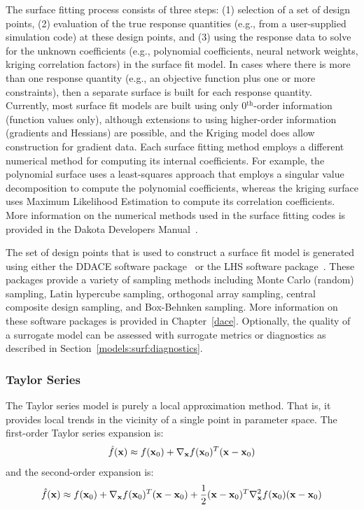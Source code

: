 The surface fitting process consists of three steps: (1) selection of
a set of design points, (2) evaluation of the true response quantities
(e.g., from a user-supplied simulation code) at these design points,
and (3) using the response data to solve for the unknown coefficients
(e.g., polynomial coefficients, neural network weights, kriging
correlation factors) in the surface fit model. In cases where there is
more than one response quantity (e.g., an objective function plus one
or more constraints), then a separate surface is built for each
response quantity. Currently, most surface fit models are built using
only 0$^{\mathrm{th}}$-order information (function values only),
although extensions to using higher-order information (gradients and
Hessians) are possible, and the Kriging model does allow construction
for gradient data. Each surface fitting method employs a different
numerical method for computing its internal coefficients. For example,
the polynomial surface uses a least-squares approach that employs a
singular value decomposition to compute the polynomial coefficients,
whereas the kriging surface uses Maximum Likelihood Estimation to
compute its correlation coefficients. More information on the
numerical methods used in the surface fitting codes is provided in the
Dakota Developers Manual~\cite{DevMan}.

The set of design points that is used to construct a surface fit model
is generated using either the DDACE software package~\cite{TonXX} or
the LHS software package~\cite{Ima84}. These packages provide a
variety of sampling methods including Monte Carlo (random) sampling,
Latin hypercube sampling, orthogonal array sampling, central composite
design sampling, and Box-Behnken sampling. More information on these
software packages is provided in Chapter~\ref{dace}.  Optionally, the
quality of a surrogate model can be assessed with surrogate metrics or
diagnostics as described in Section~\ref{models:surf:diagnostics}.

\subsubsection{Taylor Series}\label{models:surf:taylor}

The Taylor series model is purely a local approximation method. That
is, it provides local trends in the vicinity of a single point in
parameter space. The first-order Taylor series expansion is:
\begin{equation}
\hat{f}({\bf x}) \approx f({\bf x}_0) + \nabla_{\bf x} f({\bf x}_0)^T 
({\bf x} - {\bf x}_0) \label{eq:taylor1}
\end{equation}
and the second-order expansion is:
\begin{equation}
\hat{f}({\bf x}) \approx f({\bf x}_0) + \nabla_{\bf x} f({\bf x}_0)^T 
({\bf x} - {\bf x}_0) + \frac{1}{2} ({\bf x} - {\bf x}_0)^T 
\nabla^2_{\bf x} f({\bf x}_0) ({\bf x} - {\bf x}_0) \label{eq:taylor2}
\end{equation}

